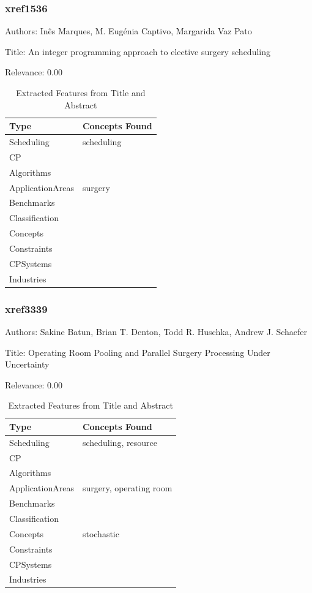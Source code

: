 \subsubsection{xref1536}
\label{mw:xref1536}

Authors: Inês Marques, M. Eugénia Captivo, Margarida Vaz Pato

Title: An integer programming approach to elective surgery scheduling

Relevance:  0.00

{\scriptsize
\begin{longtable}{p{2cm}p{20cm}}
\caption{Extracted Features from Title and Abstract}\\ \toprule
Type & Concepts Found\\ \midrule
\endhead
\bottomrule
\endfoot
Scheduling & scheduling\\ 
CP & \\ 
Algorithms & \\ 
ApplicationAreas & surgery\\ 
Benchmarks & \\ 
Classification & \\ 
Concepts & \\ 
Constraints & \\ 
CPSystems & \\ 
Industries & \\ 
\end{longtable}
}



\subsubsection{xref3339}
\label{mw:xref3339}

Authors: Sakine Batun, Brian T. Denton, Todd R. Huschka, Andrew J. Schaefer

Title: Operating Room Pooling and Parallel Surgery Processing Under Uncertainty

Relevance:  0.00

{\scriptsize
\begin{longtable}{p{2cm}p{20cm}}
\caption{Extracted Features from Title and Abstract}\\ \toprule
Type & Concepts Found\\ \midrule
\endhead
\bottomrule
\endfoot
Scheduling & scheduling, resource\\ 
CP & \\ 
Algorithms & \\ 
ApplicationAreas & surgery, operating room\\ 
Benchmarks & \\ 
Classification & \\ 
Concepts & stochastic\\ 
Constraints & \\ 
CPSystems & \\ 
Industries & \\ 
\end{longtable}
}


